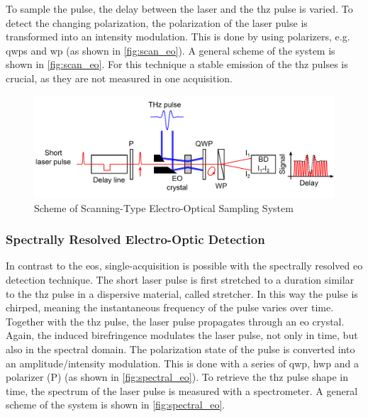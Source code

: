 To sample the pulse, the delay between the laser and the \gls{thz} pulse is varied.
To detect the changing polarization, the polarization of the laser pulse is transformed into an intensity modulation. This is done by using polarizers, e.g. \glspl{qwp} and \gls{wp} (as shown in \autoref{fig:scan_eo}).
A general scheme of the system is shown in \autoref{fig:scan_eo}.
For this technique a stable emission of the \gls{thz} pulses is crucial, as they are not measured in one acquisition. \cite{roussel2014}
\begin{figure}[tbh]
	\centering
	\includegraphics[width = \textwidth]{chap/02-theory/img/scanning_eo}
	\caption{Scheme of Scanning-Type Electro-Optical Sampling System \cite{roussel2014}}
	\label{fig:scan_eo}
\end{figure}


\subsubsection*{Spectrally Resolved Electro-Optic Detection}
In contrast to the \gls{eos}, single-acquisition is possible with the spectrally resolved \gls{eo} detection technique.
The short laser pulse is first stretched to a duration similar to the \gls{thz} pulse in a dispersive material, called stretcher.
In this way the pulse is chirped, meaning the instantaneous frequency of the pulse varies over time.
Together with the \gls{thz} pulse, the laser pulse propagates through an \gls{eo} crystal.
Again, the induced birefringence modulates the laser pulse, not only in time, but also in the spectral domain. %
The polarization state of the pulse is converted into an amplitude/intensity modulation.
This is done with a series of \gls{qwp}, \gls{hwp} and a polarizer (P) (as shown in \autoref{fig:spectral_eo}).
To retrieve the \gls{thz} pulse shape in time, the spectrum of the laser pulse is measured with a spectrometer. %
A general scheme of the system is shown in \autoref{fig:spectral_eo}. \cite{roussel2014}

